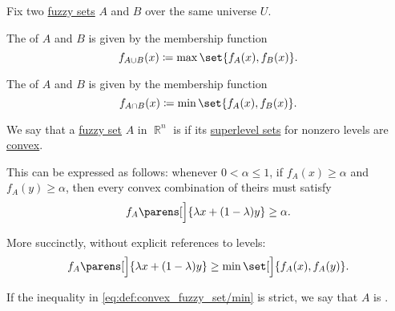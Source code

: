 \begin{definition}\label{def:basic_fuzzy_set_operations}
  Fix two \hyperref[def:fuzzy_set]{fuzzy sets} \( A \) and \( B \) over the same universe \( U \).

  \begin{thmenum}
     The  of \( A \) and \( B \) is given by the membership function
    \begin{equation}\label{eq:def:basic_fuzzy_set_operations/union}
      f_{A \cup B} (x) \coloneqq \max\set{ f_A(x), f_B(x) }.
    \end{equation}

     The  of \( A \) and \( B \) is given by the membership function
    \begin{equation}\label{eq:def:basic_fuzzy_set_operations/intersection}
      f_{A \cap B} (x) \coloneqq \min\set{ f_A(x), f_B(x) }.
    \end{equation}
  \end{thmenum}
\end{definition}

\begin{definition}\label{def:convex_fuzzy_set}
  We say that a \hyperref[def:fuzzy_set]{fuzzy set} \( A \) in \( \BbbR^n \) is  if its \hyperref[def:fuzzy_level_set]{superlevel sets} for nonzero levels are \hyperref[def:convex_set]{convex}.

  This can be expressed as follows: whenever \( 0 < \alpha \leq 1 \), if \( f_A(x) \geq \alpha \) and \( f_A(y) \geq \alpha \), then every convex combination of theirs must satisfy
  \begin{equation}\label{eq:def:convex_fuzzy_set/superlevel}
    f_A\parens[\Big]{ \lambda x + (1 - \lambda) y } \geq \alpha.
  \end{equation}

  More succinctly, without explicit references to levels:
  \begin{equation}\label{eq:def:convex_fuzzy_set/min}
    f_A\parens[\Big]{ \lambda x + (1 - \lambda) y } \geq \min\set[\Big]{ f_A(x), f_A(y) }.
  \end{equation}

  If the inequality in \eqref{eq:def:convex_fuzzy_set/min} is strict, we say that \( A \) is .
\end{definition}


